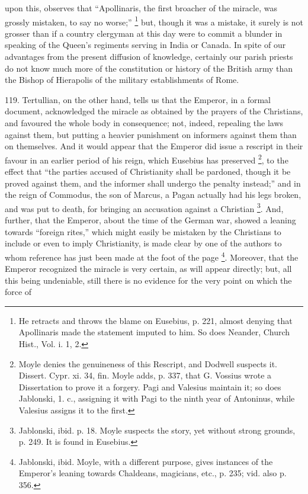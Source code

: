 upon this, observes that ``Apollinaris, the first broacher of the
miracle, was grossly mistaken, to say no worse;'' \footnote{He retracts and throws the blame on Eusebius, p. 221, almost denying
that Apollinaris made the statement imputed to him. So does Neander,
Church Hist., Vol. i. 1, 2.} but, though it was a mistake, it surely is not grosser than if
a country clergyman at this day were to commit a blunder in speaking
of the Queen's regiments serving in India or Canada. In spite of
our advantages from the present diffusion of knowledge, certainly our
parish priests do not know much more of the constitution or history of
the British army than the Bishop of Hierapolis of the military
establishments of Rome.

119. Tertullian, on the other hand, tells us that the Emperor, in a formal
document, acknowledged the miracle as obtained by the prayers of the
Christians, and favoured the whole body in consequence; not, indeed,
repealing the laws against them, but putting a heavier punishment on
informers against them than on themselves. And it would appear that
the Emperor did issue a rescript in their favour in an earlier period
of his reign, which Eusebius has preserved \footnote{Moyle denies the genuineness of this Rescript, and Dodwell suspects
it. Dissert. Cypr. xi. 34, fin. Moyle adds, p. 337, that G. Vossius
wrote a Dissertation to prove it a forgery. Pagi and Valesius maintain
it; so does Jablonski, 1. c., assigning it with Pagi to the ninth year
of Antoninus, while Valesius assigns it to the first.}, to the effect that ``the parties accused of Christianity shall
be pardoned, though it be proved against them, and the informer shall
undergo the penalty instead;'' and in the reign of Commodus, the son of
Marcus, a Pagan actually had his legs broken, and was put to death,
for bringing an accusation against a Christian \footnote{Jablonski, ibid. p. 18. Moyle suspects the story, yet without strong
grounds, p. 249. It is found in Eusebius.}. And, further, that the Emperor, about the time of the
German war, showed a leaning towards ``foreign rites,'' which might
easily be mistaken by the Christians to include or even to imply
Christianity, is made clear by one of the authors to whom reference
has just been made at the foot of the page \footnote{Jablonski, ibid. Moyle, with a different purpose, gives instances of
the Emperor's leaning towards Chaldeans, magicians, etc., p. 235; vid.
also p. 356.}. Moreover, that the Emperor recognized the miracle is very
certain, as will appear directly; but, all this being undeniable,
still there is no evidence for the very point on which the force of
